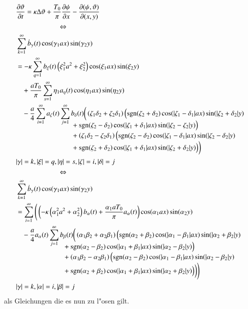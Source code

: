 \begin{align*}
&\frac{\partial\vartheta}{\partial t}
=
\kappa\Delta\vartheta
+ \frac{T_0}{\pi}\frac{\partial\psi}{\partial x}
- \frac{\partial(\psi,\vartheta)}{\partial(x,y)}
\\
&\qquad \qquad \qquad \Leftrightarrow
\\
&
\sum_{k = 1}^{\infty}
\dot{b}_{\gamma}(t)
\cos(\gamma_1 ax) \sin(\gamma_2 y)
\\
&=
-
\kappa
\sum_{q = 1}^{\infty}
b_{\xi}(t)
\left(\xi_1^2 a^2 + \xi_2^2\right)
\cos(\xi_1 ax) \sin(\xi_2 y)
\\
&\phantom{={}}
+
\frac{a T_0}{\pi}
\sum_{s = 1}^{\infty}
\eta_1
a_{\eta}(t)
\cos(\eta_1 ax) \sin(\eta_2 y)
\\
&\phantom{={}}
-
\frac{a}{4}
\sum_{i = 1}^{\infty}
a_{\zeta}(t)
\sum_{j = 1}^{\infty}
b_{\delta}(t)
\bigg(
\left(\zeta_1 \delta_2 + \zeta_2 \delta_1 \right)
\Big(
\sgn(\zeta_2 + \delta_2)
\cos(|\zeta_1 - \delta_1|ax)\sin(|\zeta_2 + \delta_2|y)
\\[-2.5ex]
&\phantom{=-abbb\sum\sum.....{}}
+
\sgn(\zeta_2 - \delta_2)
\cos(|\zeta_1 + \delta_1|ax)\sin(|\zeta_2 - \zeta_2|y)
\Big)
\\[-1.0ex]
&\phantom{=-abbb\sum\sum.....{}}
+
\left(\zeta_1 \delta_2 - \zeta_2 \delta_1 \right)
\Big(
\sgn(\zeta_2 - \delta_2)
\cos(|\zeta_1 - \delta_1|ax)\sin(|\zeta_2 - \delta_2|y)
\\[-1.0ex]
&\phantom{=-abbb\sum\sum.....{}}
+
\sgn(\zeta_2 + \delta_2)
\cos(|\zeta_1 + \delta_1|ax)\sin(|\zeta_2 + \delta_2|y)
\Big)
\bigg)
\\
&|\gamma| = k, |\xi| = q, |\eta| = s, |\zeta| = i, |\delta| = j
\\
&\qquad \qquad \qquad \Leftrightarrow
\\
&\sum_{k = 1}^{\infty}
\dot{b}_{\gamma}(t)
\cos(\gamma_1 ax) \sin(\gamma_2 y)
\\
&=
\sum_{i = 1}^{\infty}
\Bigg(
\left(
-
\kappa
\left(\alpha_1^2 a^2 + \alpha_2^2\right)
b_{\alpha}(t)
+
\frac{\alpha_1 a T_0}{\pi}
a_{\alpha}(t)
\right)
\cos(\alpha_1 ax) \sin(\alpha_2 y)
\\
&\phantom{={}}
-
\frac{a}{4}
a_{\alpha}(t)
\sum_{j = 1}^{\infty}
b_{\beta}(t)
\bigg(
\left(\alpha_1 \beta_2 + \alpha_2 \beta_1 \right)
\Big(
\sgn(\alpha_2 + \beta_2)
\cos(|\alpha_1 - \beta_1|ax)\sin(|\alpha_2 + \beta_2|y)
\\[-2.5ex]
&\phantom{=-aat\sum\sum...{}}
+
\sgn(\alpha_2 - \beta_2)
\cos(|\alpha_1 + \beta_1|ax)\sin(|\alpha_2 - \beta_2|y)
\Big)
\\[-1.0ex]
&\phantom{=-aat\sum\sum...{}}
+
\left(\alpha_1 \beta_2 - \alpha_2 \beta_1 \right)
\Big(
\sgn(\alpha_2 - \beta_2)
\cos(|\alpha_1 - \beta_1|ax)\sin(|\alpha_2 - \beta_2|y)
\\[-1.0ex]
&\phantom{=-aat\sum\sum...{}}
+
\sgn(\alpha_2 + \beta_2)
\cos(|\alpha_1 + \beta_1|ax)\sin(|\alpha_2 + \beta_2|y)
\Big)
\bigg)
\Bigg)
\\
&|\gamma| = k, |\alpha| = i, |\beta| = j
\end{align*}
als Gleichungen die es nun zu l"osen gilt.

